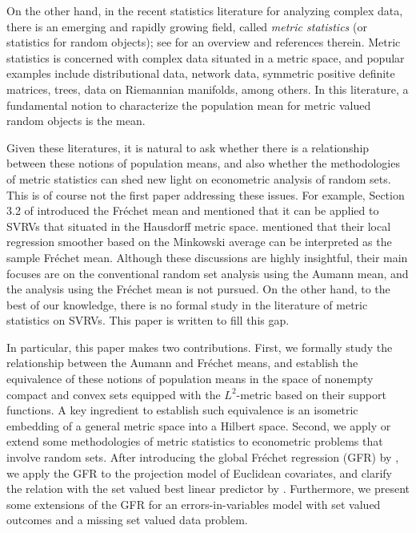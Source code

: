 \documentclass[11pt,reqno]{amsart}
\begin{document}
On the other hand, in the recent statistics literature for analyzing complex data, there is an emerging and rapidly growing field, called {\it metric statistics} (or statistics for random objects); see \cite{DuChMu24} for an overview and references therein. Metric statistics is concerned with complex data situated in a metric space, and popular examples include distributional data, network data, symmetric positive definite matrices, trees, data on Riemannian manifolds, among others. In this literature, a fundamental notion to characterize the population mean for metric valued random objects is the \cite{Fr48} mean.

Given these literatures, it is natural to ask whether there is a relationship between these notions of population means, and also whether the methodologies of metric statistics can shed new light on econometric analysis of random sets. This is of course not the first paper addressing these issues. For example, Section 3.2 of \cite{Mo17} introduced the Fr\'echet mean and mentioned that it can be applied to SVRVs that situated in the Hausdorff metric space. \cite{LiMoMoPe21} mentioned that their local regression smoother based on the Minkowski average can be interpreted as the sample Fr\'echet mean. Although these discussions are highly insightful, their main focuses are on the conventional random set analysis using the Aumann mean, and the analysis using the Fr\'echet mean is not pursued. On the other hand, to the best of our knowledge, there is no formal study in the literature of metric statistics on SVRVs. This paper is written to fill this gap.

In particular, this paper makes two contributions. First, we formally study the relationship between the Aumann and Fr\'echet means, and establish the equivalence of these notions of population means in the space of nonempty compact and convex sets equipped with the $L^2$-metric based on their support functions. A key ingredient to establish such equivalence is an isometric embedding of a general metric space into a Hilbert space. Second, we apply or extend some methodologies of metric statistics to econometric problems that involve random sets. After introducing the global Fr\'echet regression (GFR) by \cite{PeMu19}, we apply the GFR to the projection model of Euclidean covariates, and clarify the relation with the set valued best linear predictor by \cite{BeMo08}. Furthermore, we present some extensions of the GFR for an errors-in-variables model with set valued outcomes and a missing set valued data problem.
\end{document}
